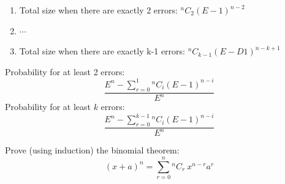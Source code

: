 \documentclass[10pt]{article}
\newcommand*{\Co}[2]{{}^{#1}C_{#2}}%
\newenvironment{solution}[2][Solution]{ \begin{trivlist}
\item[\hskip \labelsep {\bfseries #1}]}{\end{trivlist}}
\newenvironment{problem}[2][Problem]{\begin{trivlist}
\item[\hskip \labelsep {\bfseries #1}\hskip \labelsep {\bfseries #2.}]}{\end{trivlist}}
\begin{document}
\begin{solution}{1}
\begin{enumerate}[label=(\alph*)]
\begin{enumerate}[label=(\arabic*)]
    \item Total size when there are exactly 2 errors:  $\Co{n}{2} (E - 1)^{n-2}$
    \item $\dotsb$
    \item[(k)] Total size when there are exactly k-1 errors:  $\Co{n}{k-1} (E - D1)^{n-k+1 }$
    \end{enumerate}
    Probability for at least 2 errors: $$\frac{E^n - \sum^{1}_{r=0}\Co{n}{i}(E-1)^{n-i}}{E^n}$$
    Probability for at least $k$ errors: $$\frac{E^n - \sum^{k-1}_{r=0}\Co{n}{i}(E-1)^{n-i}}{E^n}$$
\end{enumerate}
\end{solution}



\vskip 0.5in
\newpage
\begin{problem}{2}
Prove (using induction) the binomial theorem:
\[
(x+a)^n = \sum_{r=0}^n{^{n}C_{r}}\ x^{n-r}a^r
\]
\end{problem}
\end{document}
